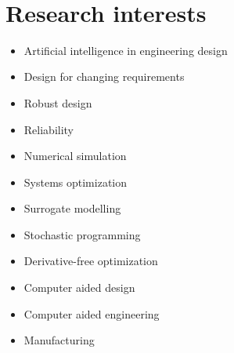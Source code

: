 \documentclass[10pt]{article} %
\begin{document}
~~~

\medskip %


\section{Research interests}


\setlength{} %

\begin{paracol}{2} %

	\begin{itemize}\itemsep0em 
		\item Artificial intelligence in engineering design
		\item Design for changing requirements
		\item Robust design
		\item Reliability
		\item Numerical simulation
		\item Systems optimization
	\end{itemize}
		
	
	\switchcolumn %
	

	\begin{itemize}\itemsep0em 
		\item Surrogate modelling
		\item Stochastic programming
		\item Derivative-free optimization
		\item Computer aided design
		\item Computer aided engineering
		\item Manufacturing
	\end{itemize}

	
\end{paracol}
\end{document}
